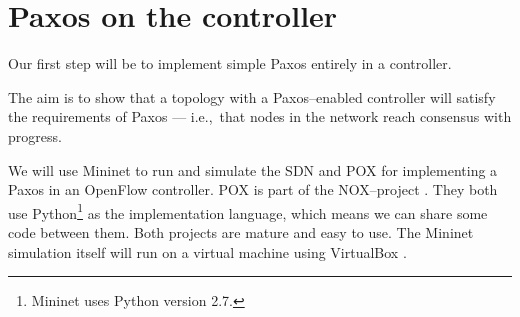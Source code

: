 \section{Paxos on the controller}

Our first step will be to implement simple Paxos \cite{Lam01} entirely in a
controller.

The aim is to show that a topology with a Paxos--enabled controller will
satisfy the requirements of Paxos --- i.e.,~that nodes in the network reach
consensus with progress.

We will use Mininet \cite{Lantz:2010:NLR:1868447.1868466} to
run and simulate the \ac{SDN} and POX \cite{POX.1} for
implementing a Paxos in an OpenFlow controller.  POX is part of the
NOX--project \cite{Gude:2008:NTO:1384609.1384625}.  They both use
Python\footnote{Mininet uses Python version 2.7.}
\cite{vanRossum:2009:PRM:1610526} as the implementation language, which
means we can share some code between them.  Both projects are mature and
easy to use.  The Mininet simulation itself will run on a virtual machine
using VirtualBox \cite{Watson:2008:VBB:1344209.1344210}.
